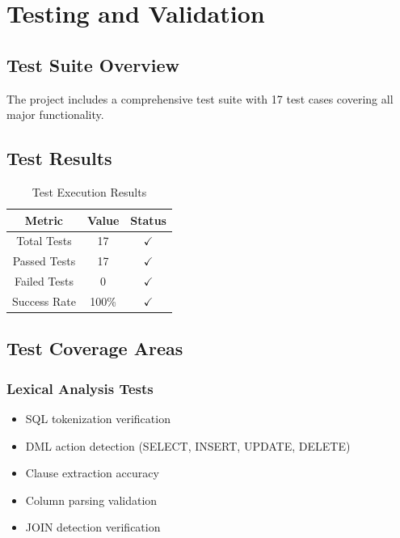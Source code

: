 \documentclass[12pt,a4paper]{article}
\begin{document}
\newpage

\section{Testing and Validation}

\subsection{Test Suite Overview}

The project includes a comprehensive test suite with 17 test cases covering all major functionality.

\subsection{Test Results}

\begin{table}[H]
    \centering
    \begin{tabular}{|c|c|c|}
        \hline
        \textbf{Metric} & \textbf{Value} & \textbf{Status} \\
        \hline
        Total Tests & 17 & $\checkmark$ \\
        Passed Tests & 17 & $\checkmark$ \\
        Failed Tests & 0 & $\checkmark$ \\
        Success Rate & 100\% & $\checkmark$ \\
        \hline
    \end{tabular}
    \caption{Test Execution Results}
    \label{tab:test-results}
\end{table}

\subsection{Test Coverage Areas}

\subsubsection{Lexical Analysis Tests}
\begin{itemize}
    \item SQL tokenization verification
    \item DML action detection (SELECT, INSERT, UPDATE, DELETE)
    \item Clause extraction accuracy
    \item Column parsing validation
    \item JOIN detection verification
\end{itemize}
\end{document}
